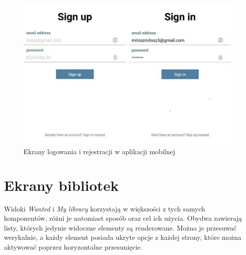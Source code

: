 \begin{figure}[H]
	\centering
	\includegraphics[width=\linewidth]{signin_signup.pdf}
	\caption{Ekrany logowania i rejestracji w aplikacji mobilnej}
\end{figure}
\section{Ekrany bibliotek}
Widoki \textit{Wanted} i \textit{My library} korzystają w większości z tych samych komponentów, różni je natomiast sposób oraz cel ich użycia. Obydwa zawierają listy, których jedynie widoczne elementy są renderowane. Można je przesuwać werykalnie, a każdy element posiada ukryte opcje z każdej strony, które można aktywować poprzez horyzontalne przesunięcie.

